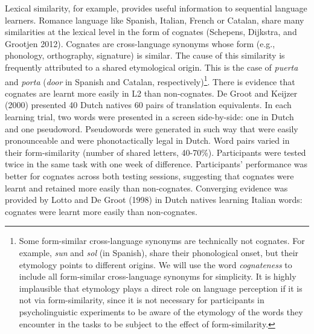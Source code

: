 \documentclass[
  man]{apa6}
\begin{document}
Lexical similarity, for example, provides useful information to
sequential language learners. Romance language like Spanish, Italian,
French or Catalan, share many similarities at the lexical level in the
form of cognates (Schepens, Dijkstra, and Grootjen 2012). Cognates are
cross-language synonyms whose form (e.g., phonology, orthography,
signature) is similar. The cause of this similarity is frequently
attributed to a shared etymological origin. This is the case of
\emph{puerta} and \emph{porta} (\emph{door} in Spanish and Catalan,
respectively)\footnote{Some form-similar cross-language synonyms are
  technically not cognates. For example, \emph{sun} and \emph{sol} (in
  Spanish), share their phonological onset, but their etymology points
  to different origins. We will use the word \emph{cognateness} to
  include all form-similar cross-language synonyms for simplicity. It is
  highly implausible that etymology plays a direct role on language
  perception if it is not via form-similarity, since it is not necessary
  for participants in psycholinguistic experiments to be aware of the
  etymology of the words they encounter in the tasks to be subject to
  the effect of form-similarity.}. There is evidence that cognates are
learnt more easily in L2 than non-cognates. De Groot and Keijzer (2000)
presented 40 Dutch natives 60 pairs of translation equivalents. In each
learning trial, two words were presented in a screen side-by-side: one
in Dutch and one pseudoword. Pseudowords were generated in such way that
were easily pronounceable and were phonotactically legal in Dutch. Word
pairs varied in their form-similarity (number of shared letters,
40-70\%). Participants were tested twice in the same task with one week
of difference. Participants' performance was better for cognates across
both testing sessions, suggesting that cognates were learnt and retained
more easily than non-cognates. Converging evidence was provided by Lotto
and De Groot (1998) in Dutch natives learning Italian words: cognates
were learnt more easily than non-cognates.
\end{document}
